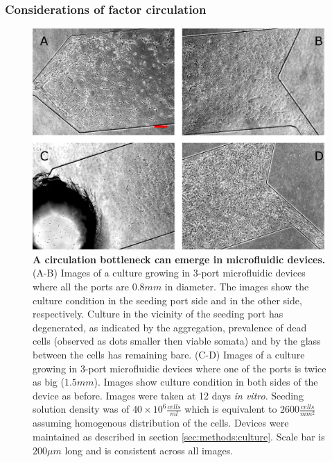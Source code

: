         \subsubsection{Considerations of factor circulation}
        \label{sec:devices:circulation}
        \begin{figure}[h]
           \centering
            \includegraphics[width=12.4cm]{chapter4/figures/volDensIssue/volDensIssue.jpg}
            \caption[Demonstration of the limitations of circulation in planar microfluidic devices]{\textbf{A circulation bottleneck can emerge in microfluidic devices.} (A-B) Images of a culture growing in 3-port microfluidic devices where all the ports are \(0.8 mm\) in diameter. The images show the culture condition in the seeding port side and in the other side, respectively. Culture in the vicinity of the seeding port has degenerated, as indicated by the aggregation, prevalence of dead cells (observed as dots smaller then viable somata) and by the glass between the cells has remaining bare. (C-D) Images of a culture growing in 3-port microfluidic devices where one of the ports is twice as big (\(1.5 mm\)). Images show culture condition in both sides of the device as before. Images were taken at 12 days \textit{in vitro}. Seeding solution density was of \(40\times10^6 \frac{cells}{ml}\) which is equivalent to \(2600 \frac{cells}{mm^2}\) assuming homogenous distribution of the cells. Devices were maintained as described in section \ref{sec:methods:culture}. Scale bar is \(200 \mu m\) long and is consistent across all images.}
            \label{fig:devices:volDensIssue}
        \end{figure}

